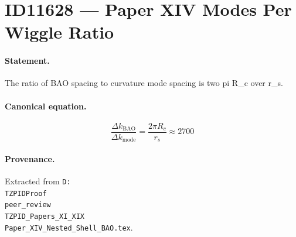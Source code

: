 \section*{ID11628 --- Paper XIV Modes Per Wiggle Ratio}

\paragraph{Statement.}
The ratio of BAO spacing to curvature mode spacing is two pi R_c over r_s.

\paragraph{Canonical equation.}
\[
\frac{\Delta k_{\mathrm{BAO}}}{\Delta k_{\mathrm{mode}}}=\frac{2\pi R_c}{r_s}\approx2700
\]

\paragraph{Provenance.}
Extracted from \texttt{D:\\TZPIDProof\\peer\_review\\TZPID\_Papers\_XI\_XIX\\Paper\_XIV\_Nested\_Shell\_BAO.tex}.
